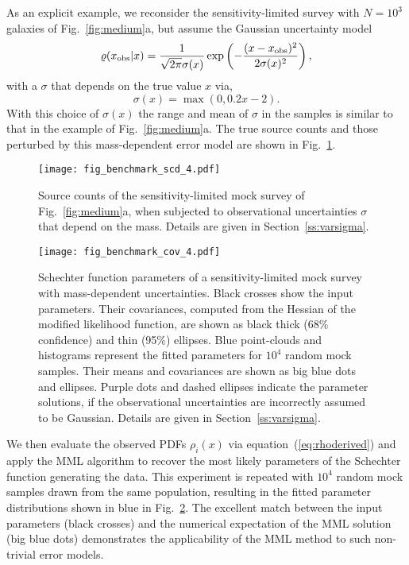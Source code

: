 \documentclass[a4paper,fleqn,usenatbib]{mnras}
\newcommand{\be}{\begin{equation}}
\newcommand{\ee}{\end{equation}}
\newcommand{\fig}[1]{Fig.~\ref{fig:#1}}
\newcommand{\eq}[1]{equation~(\ref{eq:#1})}
\renewcommand{\ss}[1]{Section~\ref{ss:#1}}
\begin{document}
As an explicit example, we reconsider the sensitivity-limited survey with $N=10^3$ galaxies of \fig{medium}a, but assume the Gaussian uncertainty model
%
\be
	\varrho(x_{\rm obs}|x) = \frac{1}{\sqrt{2\pi}\sigma(x)}\exp\left(-\frac{(x-x_{\rm obs})^2}{2\sigma(x)^2}\right),
\ee
%
with a $\sigma$ that depends on the true value $x$ via,
%
\be
	\sigma(x) = \max(0,0.2x-2).
\ee
%
With this choice of $\sigma(x)$ the range and mean of $\sigma$ in the samples is similar to that in the example of \fig{medium}a. The true source counts and those perturbed by this mass-dependent error model are shown in \fig{varsigma_scd}.

\begin{figure}
\begin{center}
\texttt{[image: fig\_benchmark\_scd\_4.pdf]}\vspace{-0.3cm}
\caption{Source counts of the sensitivity-limited mock survey of \fig{medium}a, when subjected to observational uncertainties $\sigma$ that depend on the mass. Details are given in \ss{varsigma}.}\label{fig:varsigma_scd}
\end{center}
\end{figure}

\begin{figure}
\begin{center}
\texttt{[image: fig\_benchmark\_cov\_4.pdf]}\vspace{-0.3cm}
\caption{Schechter function parameters of a sensitivity-limited mock survey with mass-dependent uncertainties. Black crosses show the input parameters. Their covariances, computed from the Hessian of the modified likelihood function, are shown as black thick (68\% confidence) and thin (95\%) ellipses. Blue point-clouds and histograms represent the fitted parameters for $10^4$ random mock samples. Their means and covariances are shown as big blue dots and ellipses. Purple dots and dashed ellipses indicate the parameter solutions, if the observational uncertainties are incorrectly assumed to be Gaussian. Details are given in \ss{varsigma}.}\label{fig:varsigma_cov}
\end{center}
\end{figure}

We then evaluate the observed PDFs $\rho_i(x)$ via \eq{rhoderived} and apply the MML algorithm to recover the most likely parameters of the Schechter function generating the data. This experiment is repeated with $10^4$ random mock samples drawn from the same population, resulting in the fitted parameter distributions shown in blue in \fig{varsigma_cov}. The excellent match between the input parameters (black crosses) and the numerical expectation of the MML solution (big blue dots) demonstrates the applicability of the MML method to such non-trivial error models.
\end{document}
